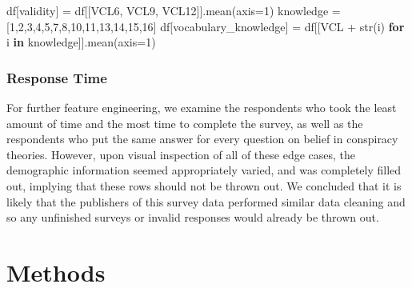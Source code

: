 \documentclass[11pt]{article}
\newenvironment{Shaded}{}{}
\newcommand{\KeywordTok}[1]{\textcolor[rgb]{0.00,0.44,0.13}{\textbf{{#1}}}}
\newcommand{\DecValTok}[1]{\textcolor[rgb]{0.25,0.63,0.44}{{#1}}}
\newcommand{\StringTok}[1]{\textcolor[rgb]{0.25,0.44,0.63}{{#1}}}
\newcommand{\NormalTok}[1]{{#1}}
\newcommand{\ControlFlowTok}[1]{\textcolor[rgb]{0.00,0.44,0.13}{\textbf{{#1}}}}
\newcommand{\OperatorTok}[1]{\textcolor[rgb]{0.40,0.40,0.40}{{#1}}}
\newcommand{\BuiltInTok}[1]{{#1}}
\begin{document}
\begin{Shaded}
\begin{Highlighting}[]
\NormalTok{df[}\StringTok{\textquotesingle{}validity\textquotesingle{}}\NormalTok{] }\OperatorTok{=}\NormalTok{ df[[}\StringTok{\textquotesingle{}VCL6\textquotesingle{}}\NormalTok{, }\StringTok{\textquotesingle{}VCL9\textquotesingle{}}\NormalTok{, }\StringTok{\textquotesingle{}VCL12\textquotesingle{}}\NormalTok{]].mean(axis}\OperatorTok{=}\DecValTok{1}\NormalTok{)}
knowledge \OperatorTok{=} [1,2,3,4,5,7,8,10,11,13,14,15,16]
\NormalTok{df[}\StringTok{\textquotesingle{}vocabulary\_knowledge\textquotesingle{}}\NormalTok{] }\OperatorTok{=}\NormalTok{ df[[}\StringTok{\textquotesingle{}VCL\textquotesingle{}} \OperatorTok{+} \BuiltInTok{str}\NormalTok{(i) }\ControlFlowTok{for}\NormalTok{ i }\KeywordTok{in}\NormalTok{ knowledge]].mean(axis}\OperatorTok{=}\DecValTok{1}\NormalTok{)}
\end{Highlighting}
\end{Shaded}

\hypertarget{time-feature-engineered}{%
\subsubsection*{Response Time}\label{time-feature-engineered}}

For further feature engineering, we examine the respondents who took
the least amount of time and the most time to complete the survey, as
well as the respondents who put the same answer for every question on
belief in conspiracy theories. However, upon visual inspection of all of
these edge cases, the demographic information seemed appropriately
varied, and was completely filled out, implying that these rows should
not be thrown out. We concluded that it is likely that the publishers of
this survey data performed similar data cleaning and so any unfinished
surveys or invalid responses would already be thrown out.

\hypertarget{methods}{%
\section*{Methods}\label{methods}}
\end{document}
